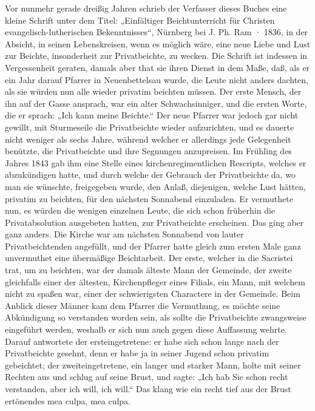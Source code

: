 Vor nunmehr gerade dreißig Jahren schrieb der Verfasser dieses Buches eine kleine Schrift unter dem Titel:
„Einfältiger Beichtunterricht für Christen evangelisch-lutherischen Bekenntnisses“, Nürnberg bei J. Ph. Ram · 1836, in der Absicht, in seinen Lebenskreisen, wenn es möglich wäre, eine neue Liebe und Lust zur Beichte, insonderheit zur Privatbeichte, zu wecken. Die Schrift ist indessen in Vergessenheit geraten, damals aber that sie ihren Dienst in dem Maße, daß, als er ein Jahr darauf Pfarrer in Neuenbettelsau wurde, die Leute nicht anders dachten, als sie würden nun alle wieder privatim beichten müssen. Der erste Mensch, der ihn auf der Gasse ansprach, war ein alter Schwachsinniger, und die ersten Worte, die er sprach: „Ich kann meine Beichte.“ Der neue Pfarrer war jedoch gar nicht gewillt, mit Sturmeseile die Privatbeichte wieder aufzurichten, und es dauerte nicht weniger als sechs Jahre, während welcher er allerdings jede Gelegenheit benützte, die Privatbeichte und ihre Segnungen anzupreisen. Im Frühling des Jahres 1843 gab ihm eine Stelle eines kirchenregimentlichen Rescripts, welches er abzukündigen hatte, und durch welche der Gebrauch der Privatbeichte da, wo man sie wünschte, freigegeben wurde, den Anlaß, diejenigen, welche Lust hätten, privatim zu beichten, für den nächsten Sonnabend einzuladen. Er vermuthete nun, es würden die wenigen einzelnen Leute, die sich schon früherhin die Privatabsolution ausgebeten hatten, zur Privatbeichte erscheinen. Das ging aber ganz anders. Die Kirche war am nächsten Sonnabend von lauter Privatbeichtenden angefüllt, und der Pfarrer hatte gleich zum ersten Male ganz unvermuthet eine übermäßige Beichtarbeit. Der erste, welcher in die Sacristei trat, um zu beichten, war der damals älteste Mann der
Gemeinde, der zweite gleichfalls einer der ältesten, Kirchenpfleger eines Filials, ein Mann, mit welchem nicht zu spaßen war, einer der schwierigsten Charactere in der Gemeinde. Beim Anblick dieser Männer kam dem Pfarrer die Vermuthung, es möchte seine Abkündigung so verstanden worden sein, als sollte die Privatbeichte zwangsweise eingeführt werden, weshalb er sich nun auch gegen diese Auffassung wehrte. Darauf antwortete der ersteingetretene: er habe sich schon lange nach der Privatbeichte gesehnt, denn er habe ja in seiner Jugend schon privatim gebeichtet; der zweiteingetretene, ein langer und starker Mann, holte mit seiner Rechten aus und schlug auf seine Brust, und sagte: „Ich hab Sie schon recht verstanden, aber ich will, ich will.“ Das klang wie ein recht tief aus der Brust ertönendes mea culpa, mea culpa.

